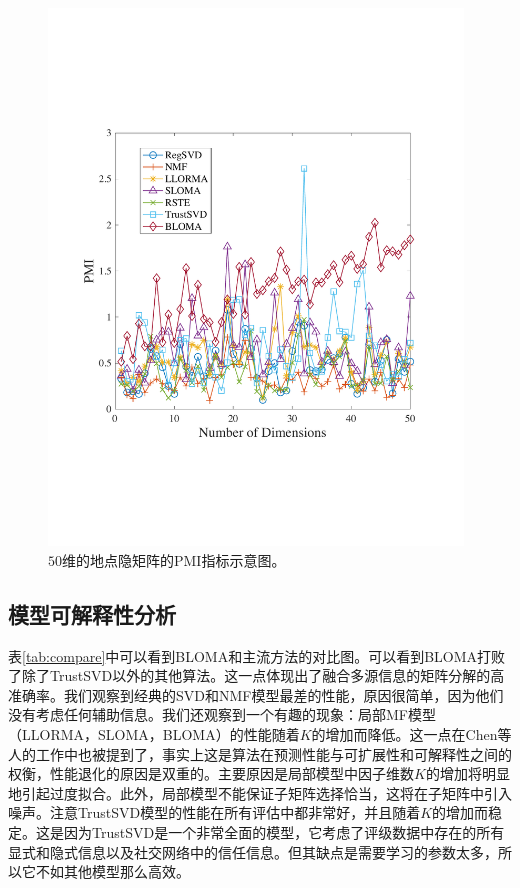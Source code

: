 \begin{figure}[!thb]
\centering
\includegraphics[width=110mm]{pics/pmi.pdf}
\caption{$50$维的地点隐矩阵的PMI指标示意图。} 
\label{pmi}
\end{figure}
\subsection{模型可解释性分析}

表\ref{tab:compare}中可以看到BLOMA和主流方法的对比图。可以看到BLOMA打败了除了TrustSVD以外的其他算法。这一点体现出了融合多源信息的矩阵分解的高准确率。我们观察到经典的SVD和NMF模型最差的性能，原因很简单，因为他们没有考虑任何辅助信息。我们还观察到一个有趣的现象：局部MF模型（LLORMA，SLOMA，BLOMA）的性能随着$K$的增加而降低。这一点在Chen等人的工作中也被提到了，事实上这是算法在预测性能与可扩展性和可解释性之间的权衡，性能退化的原因是双重的。主要原因是局部模型中因子维数$K$的增加将明显地引起过度拟合。此外，局部模型不能保证子矩阵选择恰当，这将在子矩阵中引入噪声。注意TrustSVD模型的性能在所有评估中都非常好，并且随着$ K $的增加而稳定。这是因为TrustSVD是一个非常全面的模型，它考虑了评级数据中存在的所有显式和隐式信息以及社交网络中的信任信息。但其缺点是需要学习的参数太多，所以它不如其他模型那么高效。

